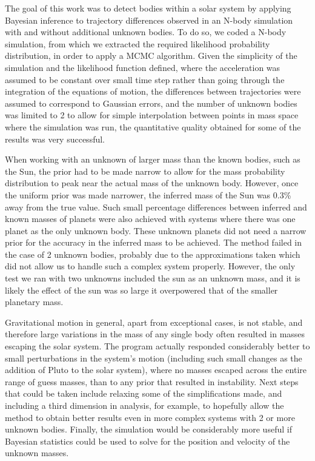 \documentclass[twocolumn]{aastex63}
\begin{document}
The goal of this work was to detect bodies within a solar system by applying Bayesian inference to trajectory differences observed in an N-body simulation with and without additional unknown bodies. To do so, we coded a N-body simulation, from which we extracted the required likelihood probability distribution, in order to apply a MCMC algorithm. Given the simplicity of the simulation and the likelihood function defined, where the acceleration was assumed to be constant over small time step rather than going through the integration of the equations of motion, the differences between trajectories were assumed to correspond to Gaussian errors, and the number of unknown bodies was limited to 2 to allow for simple interpolation between points in mass space where the simulation was run, the quantitative quality obtained for some of the results was very successful.

When working with an unknown of larger mass than the known bodies, such as the Sun, the prior had to be made narrow to allow for the mass probability distribution to peak near the actual mass of the unknown body. However, once the uniform prior was made narrower, the inferred mass of the Sun was 0.3\% away from the true value. Such small percentage differences between inferred and known masses of planets were also achieved with systems where there was one planet as the only unknown body. These unknown planets did not need a narrow prior for the accuracy in the inferred mass to be achieved. The method failed in the case of 2 unknown bodies, probably due to the approximations taken which did not allow us to handle such a complex system properly. However, the only test we ran with two unknowns included the sun as an unknown mass, and it is likely the effect of the sun was so large it overpowered that of the smaller planetary mass.

Gravitational motion in general, apart from exceptional cases, is not stable, and therefore large variations in the mass of any single body often resulted in masses escaping the solar system. The program actually responded considerably better to small perturbations in the system's motion (including such small changes as the addition of Pluto to the solar system), where no masses escaped across the entire range of guess masses, than to any prior that resulted in instability. Next steps that could be taken include relaxing some of the simplifications made, and including a third dimension in analysis, for example, to hopefully allow the method to obtain better results even in more complex systems with 2 or more unknown bodies. Finally, the simulation would be considerably more useful if Bayesian statistics could be used to solve for the position and velocity of the unknown masses.


\end{document}

